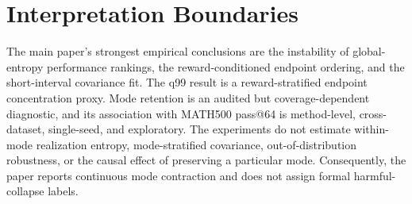 \documentclass[letterpaper]{article}
\begin{document}
\section{Interpretation Boundaries}

The main paper's strongest empirical conclusions are the instability of
global-entropy performance rankings, the reward-conditioned endpoint
ordering, and the short-interval covariance fit.  The q99 result is a
reward-stratified endpoint concentration proxy.  Mode retention is an audited
but coverage-dependent diagnostic, and its association with MATH500 pass@64
is method-level, cross-dataset, single-seed, and exploratory.  The experiments
do not estimate within-mode realization entropy, mode-stratified covariance,
out-of-distribution robustness, or the causal effect of preserving a
particular mode.  Consequently, the paper reports continuous mode contraction
and does not assign formal harmful-collapse labels.


\end{document}
